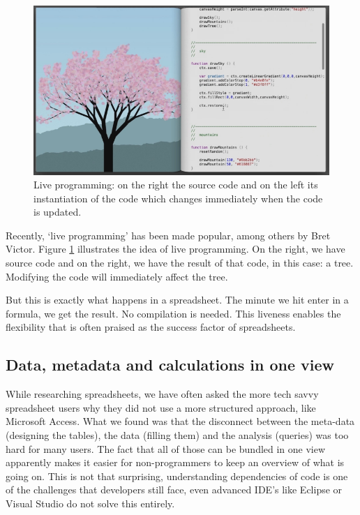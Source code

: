 \documentclass[conference]{IEEEtran}
\begin{document}
\begin{figure}
  \begin{center}
  \includegraphics[width=\columnwidth]{fig/bret.png}
  \caption{Live programming: on the right the source code and on the left its instantiation of the code which changes immediately when the code is updated.}
  \label{fig:bret}
  \end{center}
\end{figure} 


Recently, ‘live programming’ has been made popular, among others by Bret Victor. Figure \ref{fig:bret} illustrates the idea of live programming. On the right, we have source code and on the right, we have the result of that code, in this case: a tree. Modifying the code will immediately affect the tree.
 
But this is exactly what happens in a spreadsheet. The minute we hit enter in a formula, we get the result. No compilation is needed. This liveness enables the flexibility that is often praised as the success factor of spreadsheets.

\subsection{Data, metadata and calculations in one view}
While researching spreadsheets, we have often asked the more tech savvy spreadsheet users why they did not use a more structured approach, like Microsoft Access. What we found was that the disconnect between the meta-data (designing the tables), the data (filling them) and the analysis (queries) was too hard for many users. The fact that all of those can be bundled in one view apparently makes it easier for non-programmers to keep an overview of what is going on. This is not that surprising, understanding dependencies of code is one of the challenges that developers still face, even advanced IDE's like Eclipse or Visual Studio do not solve this entirely. 
\end{document}
